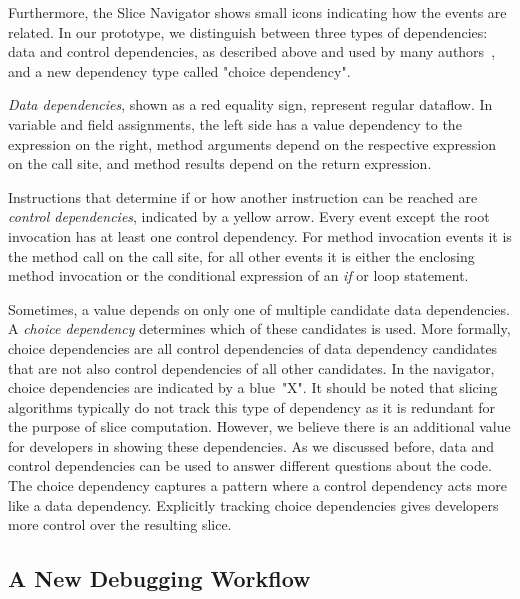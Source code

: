 \documentclass[
			english,
			]{elsarticle}
\begin{document}
Furthermore, the Slice Navigator shows small icons indicating how the events are related.
In our prototype, we distinguish between three types of dependencies: data and control dependencies, as described above and used by many authors~\cite{weiser_program_1981, agrawal_dynamic_1990, zhang_precise_2003, korel_dynamic_1990}, and a new dependency type called "choice dependency".

\emph{Data dependencies}, shown as a red equality sign, represent regular dataflow.
In variable and field assignments, the left side has a value dependency to the expression on the right, method arguments depend on the respective expression on the call site, and method results depend on the return expression.

Instructions that determine if or how another instruction can be reached are \emph{control dependencies}, indicated by a yellow arrow.
Every event except the root invocation has at least one control dependency.
For method invocation events it is the method call on the call site, for all other events it is either the enclosing method invocation or the conditional expression of an \emph{if} or loop statement.

Sometimes, a value depends on only one of multiple candidate data dependencies. 
A \emph{choice dependency} determines which of these candidates is used.
More formally, choice dependencies are all control dependencies of data dependency candidates that are not also control dependencies of all other candidates.
In the navigator, choice dependencies are indicated by a blue~"X".
It should be noted that slicing algorithms typically do not track this type of dependency as it is redundant for the purpose of slice computation.
However, we believe there is an additional value for developers in showing these dependencies.
As we discussed before, data and control dependencies can be used to answer different questions about the code.
The choice dependency captures a pattern where a control dependency acts more like a data dependency.
Explicitly tracking choice dependencies gives developers more control over the resulting slice. %


\subsection{A New Debugging Workflow}
\end{document}
